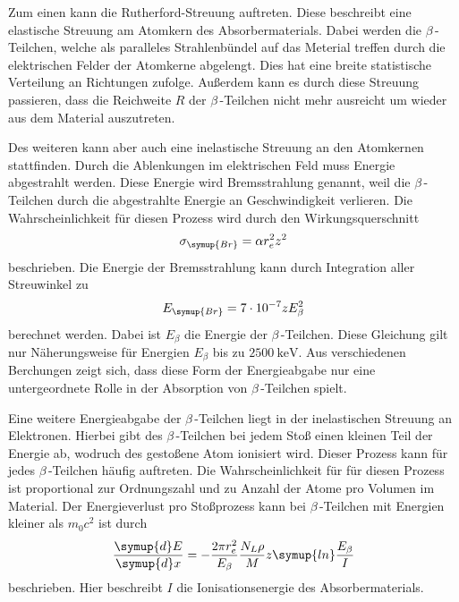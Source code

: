 Zum einen kann die Rutherford-Streuung auftreten. Diese beschreibt eine elastische Streuung am Atomkern des Absorbermaterials. Dabei werden die $\beta$\,-Teilchen, welche 
als paralleles Strahlenbündel auf das Meterial treffen durch die elektrischen Felder der Atomkerne abgelengt. Dies hat eine breite statistische Verteilung an Richtungen 
zufolge. Außerdem kann es durch diese Streuung passieren, dass die Reichweite $R$ der $\beta$\,-Teilchen nicht mehr ausreicht um wieder aus dem Material auszutreten. 


Des weiteren kann aber auch eine inelastische Streuung an den Atomkernen stattfinden. Durch die Ablenkungen im elektrischen Feld muss Energie abgestrahlt werden. Diese 
Energie wird Bremsstrahlung genannt, weil die $\beta$\,-Teilchen durch die abgestrahlte Energie an Geschwindigkeit verlieren. Die Wahrscheinlichkeit für diesen Prozess
wird durch den Wirkungsquerschnitt
\begin{equation*}
    \sigma_{\symup{Br}} = \alpha r_e^2 z^2
\end{equation*}
beschrieben. Die Energie der Bremsstrahlung kann durch Integration aller Streuwinkel zu 
\begin{equation*}
    E_{\symup{Br}} = 7\cdot 10^{-7} z E_\beta^2
\end{equation*}
berechnet werden. Dabei ist $E_\beta$ die Energie der $\beta$\,-Teilchen. Diese Gleichung gilt nur Näherungsweise für Energien $E_\beta$ bis zu $\qty{2500}{\kilo\electronvolt}$. 
Aus verschiedenen Berchungen zeigt sich, dass diese Form der Energieabgabe nur eine untergeordnete Rolle in der Absorption von $\beta$\,-Teilchen spielt.

Eine weitere Energieabgabe der $\beta$\,-Teilchen liegt in der inelastischen Streuung an Elektronen. Hierbei gibt des $\beta$\,-Teilchen bei jedem Stoß einen kleinen Teil der
Energie ab, wodruch des gestoßene Atom ionisiert wird. Dieser Prozess kann für jedes $\beta$\,-Teilchen häufig auftreten. Die Wahrscheinlichkeit für für diesen Prozess
ist proportional zur Ordnungszahl und zu Anzahl der Atome pro Volumen im Material. Der Energieverlust pro Stoßprozess kann bei $\beta$\,-Teilchen mit Energien kleiner als
$m_0 c^2$ ist durch 
\begin{equation}
    \label{eqn:inelast_elek_everlust}
    \frac{\symup{d}E}{\symup{d}x} = -\frac{2\pi r_e^2}{E_\beta}\frac{N_L\rho}{M}z\symup{ln}\frac{E_\beta}{I}
\end{equation}
beschrieben. Hier beschreibt $I$ die Ionisationsenergie des Absorbermaterials.

